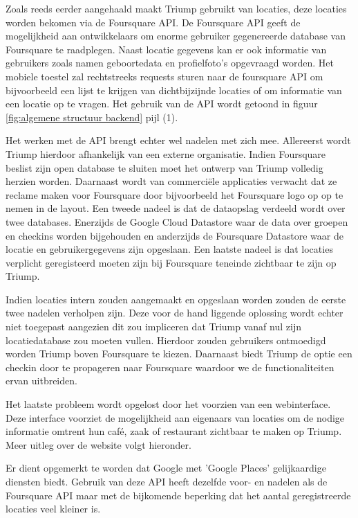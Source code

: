 Zoals reeds eerder aangehaald maakt Triump gebruikt van locaties, deze locaties worden bekomen via de Foursquare API. De Foursquare API geeft de mogelijkheid aan ontwikkelaars om enorme gebruiker gegenereerde database van Foursquare te raadplegen. Naast locatie gegevens kan er ook informatie van gebruikers zoals namen geboortedata en profielfoto's opgevraagd worden.  Het mobiele toestel zal rechtstreeks requests sturen naar de foursquare API om bijvoorbeeld een lijst te krijgen van dichtbijzijnde locaties of om informatie van een locatie op te vragen. Het gebruik van de API wordt getoond in figuur \ref{fig:algemene structuur backend} pijl (1).

Het werken met de API brengt echter wel nadelen met zich mee.
Allereerst wordt Triump hierdoor afhankelijk van een externe organisatie. Indien Foursquare beslist zijn open database te sluiten moet het ontwerp van Triump volledig herzien worden. Daarnaast wordt van commerciële applicaties verwacht dat ze reclame maken voor Foursquare door bijvoorbeeld het Foursquare logo op op te nemen in de layout.  Een tweede nadeel is dat de dataopslag verdeeld wordt over twee databases. Enerzijds de Google Cloud Datastore waar de data over groepen en checkins worden bijgehouden en anderzijds de Foursquare Datastore waar de locatie en gebruikergegevens zijn opgeslaan. Een laatste nadeel is dat locaties verplicht geregisteerd moeten zijn bij Foursquare teneinde zichtbaar te zijn op Triump. 

Indien locaties intern zouden aangemaakt en opgeslaan worden zouden de eerste twee nadelen verholpen zijn. 
Deze voor de hand liggende oplossing wordt echter niet toegepast aangezien dit zou impliceren dat Triump vanaf nul zijn locatiedatabase zou moeten vullen. Hierdoor zouden gebruikers ontmoedigd worden Triump boven Foursquare te kiezen. Daarnaast biedt Triump de optie een checkin door te propageren naar Foursquare waardoor we de functionaliteiten ervan uitbreiden. 

Het laatste probleem wordt opgelost door het voorzien van een webinterface. Deze interface voorziet de mogelijkheid aan eigenaars van locaties om de nodige informatie omtrent hun café, zaak of restaurant zichtbaar te maken op Triump. Meer uitleg over de website volgt hieronder.

Er dient opgemerkt te worden dat Google met 'Google Places' gelijkaardige diensten biedt. Gebruik van deze API heeft dezelfde voor- en nadelen als de Foursquare API maar met de bijkomende beperking dat het aantal geregistreerde locaties veel kleiner is.


